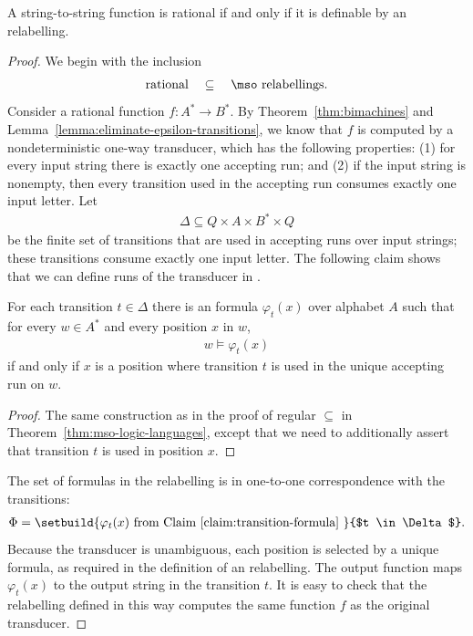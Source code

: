 \begin{theorem}
    \label{thm:logic-rational-functions}
    A string-to-string function is rational if and only if it is definable by an \mso relabelling.
\end{theorem}
\begin{proof}
    We begin with the inclusion 
    \begin{align*}
    \text{rational} \quad \subseteq \quad \text{\mso relabellings.}
    \end{align*}
    Consider a rational function $f : A^* \to B^*$. By Theorem~\ref{thm:bimachines} and Lemma~\ref{lemma:eliminate-epsilon-transitions}, we  know that $f$  is computed by a nondeterministic one-way transducer, which has the following properties: (1) for every input string there is exactly one accepting run; and (2) if the input string is nonempty, then every transition used in the accepting run consumes exactly one input letter.  Let 
    \begin{align*}
    \Delta \subseteq Q \times A \times B^* \times Q
    \end{align*}
    be the finite set of  transitions that are used in accepting runs over input strings; these transitions consume exactly one input letter.  The following claim shows that we can define runs of the transducer in \mso.  
    \begin{claim}\label{claim:transition-formula}
        For each transition $t \in \Delta$ there is an \mso formula $\varphi_t(x)$ over alphabet $A$ such that for every $w \in A^*$ and every position $x$ in $w$, 
    \begin{align*}
    w \models \varphi_t(x)
    \end{align*}
     if and only if $x$ is a position where transition $t$ is used in the unique accepting run on $w$. 
    \end{claim}
    \begin{proof}
        The same construction as in the proof of regular $\subseteq$ \mso in Theorem~\ref{thm:mso-logic-languages}, except that we need to additionally assert that transition $t$ is used in position $x$.
    \end{proof}
    The set of formulas in the \mso relabelling is in one-to-one correspondence with the transitions:
\begin{align*}
\Phi = \setbuild{\varphi_t(x) \text{ from Claim~\ref{claim:transition-formula} }}{$t \in \Delta$}.
\end{align*}
Because the transducer is unambiguous, each position is selected by a unique formula, as required in the definition of an \mso relabelling. The output function maps $\varphi_t(x)$ to the output string in the transition $t$. It is easy to check that the \mso relabelling defined in this way computes the same function $f$ as the original transducer.


\end{proof}
